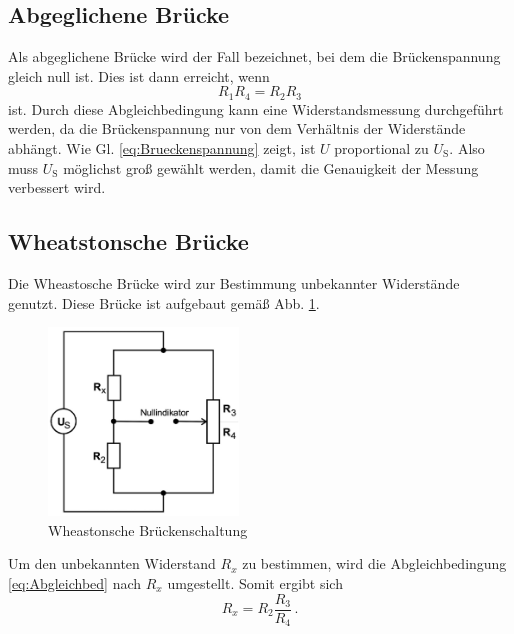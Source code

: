     \subsection{Abgeglichene Brücke}
    Als abgeglichene Brücke wird der Fall bezeichnet, bei dem die Brückenspannung gleich null ist.
    Dies ist dann erreicht, wenn
    \begin{equation}
        R_1 R_4 = R_2 R_3
        \label{eq:Abgleichbed}
    \end{equation}
    ist.
    Durch diese Abgleichbedingung kann eine Widerstandsmessung durchgeführt werden, da die Brückenspannung
    nur von dem Verhältnis der Widerstände abhängt.
    Wie Gl. \ref{eq:Brueckenspannung} zeigt, ist $U$ proportional zu $U_{\text{S}}$.
    Also muss $U_{\text{S}}$ möglichst groß gewählt werden, damit die Genauigkeit der Messung verbessert wird.
    \subsection{Wheatstonsche Brücke}
    Die Wheastosche Brücke wird zur Bestimmung unbekannter Widerstände genutzt.
    Diese Brücke ist aufgebaut gemäß Abb. \ref{fig:Wheastonsche_Bruecke}.
    \begin{figure}
        \centering
        \includegraphics[height= 5cm]{Messdaten/Wheastonsche-Brueke.jpg}
        \caption{Wheastonsche Brückenschaltung}
        \label{fig:Wheastonsche_Bruecke}
    \end{figure}
    Um den unbekannten Widerstand $R_x$ zu bestimmen, wird die Abgleichbedingung \eqref{eq:Abgleichbed} nach $R_x$ umgestellt.
    Somit ergibt sich
    \begin{equation*}
        R_x = R_2 \frac{R_3}{R_4} \, \text{.}
    \end{equation*}
